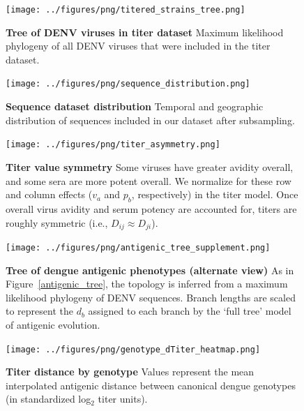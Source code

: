 \begin{figure}[h]
\centering
	\texttt{[image: ../figures/png/titered\_strains\_tree.png]}
	\caption{\textbf{Tree of DENV viruses in titer dataset}
  Maximum likelihood phylogeny of all DENV viruses that were included in the titer dataset.
	}
	\label{titered_strains_tree}
\end{figure}

\begin{figure}[h]
\centering
	\texttt{[image: ../figures/png/sequence\_distribution.png]}
	\caption{\textbf{Sequence dataset distribution}
  Temporal and geographic distribution of sequences included in our dataset after subsampling.
	}
	\label{sequence_distribution}
\end{figure}

\begin{figure}[h]
  \centering
  \texttt{[image: ../figures/png/titer\_asymmetry.png]}
  \caption{\textbf{Titer value symmetry}
  Some viruses have greater avidity overall, and some sera are more potent overall.
  We normalize for these row and column effects ($v_a$ and $p_b$, respectively) in the titer model.
  Once overall virus avidity and serum potency are accounted for, titers are roughly symmetric (i.e., $D_{ij} \approx D_{ji}$).
  }
\label{titer_asymmetry}
\end{figure}

\begin{figure}[h]
  \centering
  \texttt{[image: ../figures/png/antigenic\_tree\_supplement.png]}
  \caption{\textbf{Tree of dengue antigenic phenotypes (alternate view)}
As in Figure~\ref{antigenic_tree}, the topology is inferred from a maximum likelihood phylogeny of DENV sequences.
Branch lengths are scaled to represent the $d_b$ assigned to each branch by the `full tree' model of antigenic evolution.
  }
\label{antigenic_tree_supplement}
\end{figure}

\begin{figure}[h]
\centering
	\texttt{[image: ../figures/png/genotype\_dTiter\_heatmap.png]}
	\caption{\textbf{Titer distance by genotype}
  Values represent the mean interpolated antigenic distance between canonical dengue genotypes (in standardized log$_2$ titer units).
  }
	\label{genotype_dTiter_heatmap}
\end{figure}





